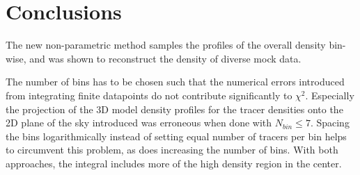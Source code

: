 \section{Conclusions}\label{sec:conclusions}

The new non-parametric method samples the profiles of the overall
density bin-wise, and was shown to reconstruct the density of diverse
mock data.


The number of bins has to be chosen such that the numerical errors
introduced from integrating finite datapoints do not contribute
significantly to $\chi^2$. Especially the projection of the 3D model
density profiles for the tracer densities onto the 2D plane of the sky
introduced was erroneous when done with $N_{bin}\leq7$. Spacing the
bins logarithmically instead of setting equal number of tracers per
bin helps to circumvent this problem, as does increasing the number of
bins. With both approaches, the integral  includes more of
the high density region in the center.


